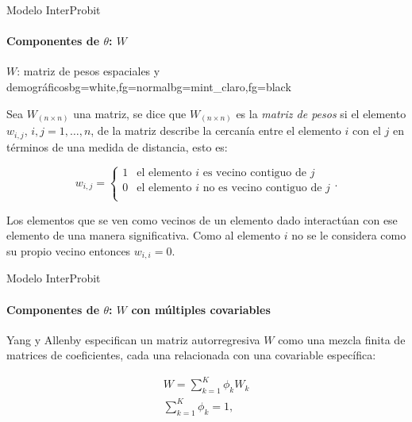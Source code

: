 \setwatermark{\fontsize{60pt}{60pt}\selectfont{ }}
\begin{frame}{Modelo InterProbit}
\framesubtitle{Componentes de $\theta$: $W$}

\begin{variableblock}{$W$: matriz de pesos espaciales y demográficos}{bg=white,fg=normal}{bg=mint_claro,fg=black}

Sea $W_{\left(n \times n\right)}$ una matriz, se dice que $W_{\left(n \times n\right)}$ es la \textit{matriz de pesos} si el elemento $w_{i,j}$, $i,j = 1,\dots,n$, de la matriz describe la cercanía entre el elemento $i$ con el $j$ en términos de una medida de distancia, esto es:

\[
w_{i,j} = 
  \begin{cases*}
  1 & \text{el elemento $i$ es vecino contiguo de $j$} \\
  0 & \text{el elemento $i$ no es vecino contiguo de $j$} \\
  \end{cases*}.
\]

Los elementos que se ven como vecinos de un elemento dado interactúan con ese elemento de una manera significativa.
Como al elemento $i$ no se le considera como su propio vecino entonces $w_{i,i} = 0$.
\end{variableblock}

\end{frame}

\setwatermark{\fontsize{60pt}{60pt}\selectfont{ }}
\begin{frame}{Modelo InterProbit}
\framesubtitle{Componentes de $\theta$: $W$ con múltiples covariables}

Yang y Allenby\cite{yang2003_interdependent} especifican un matriz autorregresiva $W$ como una mezcla finita de matrices de coeficientes, cada una relacionada con una covariable específica:

\begin{gather}
  W = \sum_{k=1}^{K} \phi_k W_k \\
  \sum_{k=1}^{K} \phi_k = 1,
\end{gather}

\end{frame}

